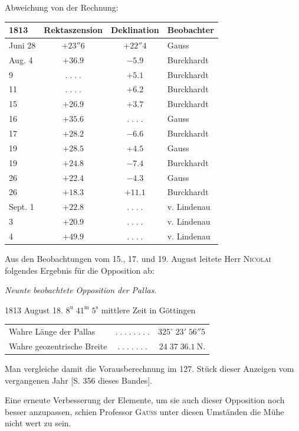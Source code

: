\begin{center}Abweichung von der Rechnung:\end{center}
\begin{center}\fontsize{10}{12}\selectfont\setlength{\tabcolsep}{7pt}\renewcommand{\arraystretch}{1.15}\begin{tabular}{l|c|c|l}
1813 & Rektaszension & Deklination & Beobachter\\\hline
Juni 28 & $+23''6$ & $+22''4$ & Gauss\\
Aug. 4 & $+36.9$ & $-5.9$ & Burckhardt\\
9 & $.\;.\;.\;.$ & $+5.1$ & Burckhardt\\
11 & $.\;.\;.\;.$ & $+6.2$ & Burckhardt\\
15 & $+26.9$ & $+3.7$ & Burckhardt\\
16 & $+35.6$ & $.\;.\;.\;.$ & Gauss\\
17 & $+28.2$ & $-6.6$ & Burckhardt\\
19 & $+28.5$ & $+4.5$ & Gauss\\
19 & $+24.8$ & $-7.4$ & Burckhardt\\
26 & $+22.4$ & $-4.3$ & Gauss\\
26 & $+18.3$ & $+11.1$ & Burckhardt\\
Sept. 1 & $+22.8$ & $.\;.\;.\;.$ & v. Lindenau\\
3 & $+20.9$ & $.\;.\;.\;.$ & v. Lindenau\\
4 & $+49.9$ & $.\;.\;.\;.$ & v. Lindenau\\
\end{tabular}\end{center}

\par\indent Aus den Beobachtungen vom 15., 17. und 19. August leitete Herr \textsc{Nicolai} folgendes Ergebnis für die Opposition ab:

\begin{center}\emph{Neunte beobachtete Opposition der Pallas.}\end{center}
\begin{center}1813 August 18. $8^{\mathrm u}\;41^{\mathrm m}\;5^{\mathrm s}$ mittlere Zeit in Göttingen\end{center}
\begin{center}\fontsize{10}{12}\selectfont\setlength{\tabcolsep}{3pt}\renewcommand{\arraystretch}{1.15}\begin{tabular}{lcr}
Wahre Länge der Pallas & $.\;.\;.\;.\;.\;.\;.\;.$ & $325^\circ\;23'\;56''5$\\
Wahre geozentrische Breite & $.\;.\;.\;.\;.\;.\;.$ & $24\;37\;36.1\ \mathrm{N.}$\\
\end{tabular}\end{center}

\noindent Man vergleiche damit die Vorausberechnung im 127. Stück dieser Anzeigen vom vergangenen Jahr [S. 356 dieses Bandes].

\par\indent Eine erneute Verbesserung der Elemente, um sie auch dieser Opposition noch besser anzupassen, schien Professor \textsc{Gauss} unter diesen Umständen die Mühe nicht wert zu sein.
